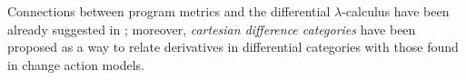 Connections between program metrics and the differential $\lambda$-calculus have been already suggested in \cite{PistoneLICS}; moreover, \emph{cartesian difference categories} \cite{Picallo2020} have been proposed as a way to relate derivatives in differential categories with those found in change action models.


%
%
%
%
 










